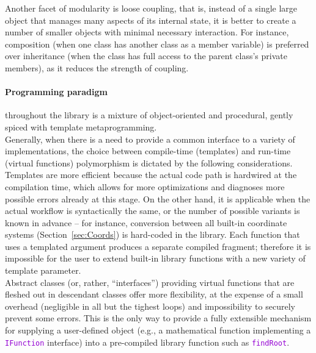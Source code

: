 \documentclass[12pt]{article}
\newcommand{\ttt}[1]{\textcolor{darkviolet}{\texttt{#1}}}
\let\oldparagraph\paragraph
\renewcommand{\paragraph}[1]{\vspace{-2mm}\oldparagraph{#1}}
\begin{document}
Another facet of modularity is loose coupling, that is, instead of a single large object that manages many aspects of its internal state, it is better to create a number of smaller objects with minimal necessary interaction. For instance, composition (when one class has another class as a member variable) is preferred over inheritance (when the class has full access to the parent class's private members), as it reduces the strength of coupling.

\paragraph{Programming paradigm} throughout the library is a mixture of object-oriented and procedural, gently spiced with template metaprogramming.\\
Generally, when there is a need to provide a common interface to a variety of implementations, the choice between compile-time (templates) and run-time (virtual functions) polymorphism is dictated by the following considerations.\\
Templates are more efficient because the actual code path is hardwired at the compilation time, which allows for more optimizations and diagnoses more possible errors already at this stage. On the other hand, it is applicable when the actual workflow is syntactically the same, or the number of possible variants is known in advance -- for instance, conversion between all built-in coordinate systems (Section~\ref{sec:Coords}) is hard-coded in the library. Each function that uses a templated argument produces a separate compiled fragment; therefore it is impossible for the user to extend built-in library functions with a new variety of template parameter.\\
Abstract classes (or, rather, ``interfaces'') providing virtual functions that are fleshed out in descendant classes offer more flexibility, at the expense of a small overhead (negligible in all but the tighest loops) and impossibility to securely prevent some errors. This is the only way to provide a fully extensible mechanism for supplying a user-defined object (e.g., a mathematical function implementing a \ttt{IFunction} interface) into a pre-compiled library function such as \ttt{findRoot}.
\end{document}
